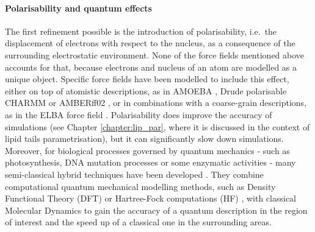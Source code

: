 \paragraph{Polarisability and quantum effects}
The first refinement possible is the introduction of polarisability, i.e.\ the displacement of electrons with respect to the nucleus, as a consequence of the surrounding electrostatic environment. None of the force fields mentioned above accounts for that, because electrons and nucleus of an atom are modelled as a unique object. Specific force fields have been modelled to include this effect, either on top of atomistic descriptions, as in AMOEBA \citep{Ren2003,Ponder2010}, Drude polarisable CHARMM \citep{Anisimov2004} or AMBERff02 \citep{Cieplak2001}, or in combinations with a coarse-grain descriptions, as in the ELBA force field \citep{Orsi2011}. Polarisability does improve the accuracy of simulations (see Chapter \ref{chapter:lip_par}, where it is discussed in the context of lipid tails parametrisation), but it can significantly slow down simulations.
%
Moreover, for biological processes governed by quantum mechanics - such as photosynthesis, DNA mutation processes or some enzymatic activities - many semi-classical hybrid techniques have been developed \citep{Ahmadi2018}. They combine computational quantum mechanical modelling methods, such as Density Functional Theory (DFT) or Hartree-Fock computations (HF) \citep{Shao2015}, with classical Molecular Dynamics to gain the accuracy of a quantum description in the region of interest and the speed up of a classical one in the surrounding areas.

